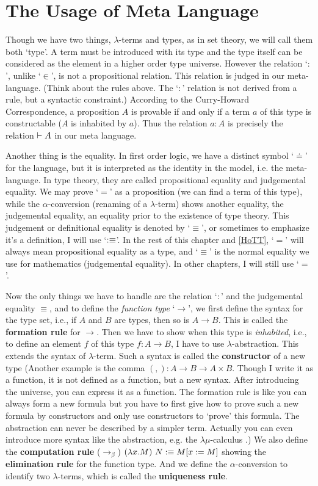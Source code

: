 \section{The Usage of Meta Language}
Though we have two things, $\lambda$-terms and types, as in set theory,
we will call them both `type'. A term must be introduced with its type 
and the type itself can be considered as the element in a higher order 
type universe. However the relation `$:$', unlike `$\in$', is not a 
propositional relation. This relation is judged in our meta-language. 
(Think about the rules above. The `$:$' relation is not derived from a 
rule, but a syntactic constraint.) According to the Curry-Howard 
Correspondence, a proposition $A$ is provable if and only if a term 
$a$ of this type is constructable ($A$ is inhabited by $a$). Thus the 
relation $a:A$ is precisely the relation $\vdash A$ in our meta language. 

Another thing is the equality. In first order logic, we have a distinct
symbol `$\doteq$' for the language, but it is interpreted as the identity
in the model, i.e. the meta-language. In type theory, they are called
propositional equality and judgemental equality. We may prove `$=$' as
a proposition (we can find a term of this type), while the 
$\alpha$-conversion (renaming of a $\lambda$-term) shows another equality,
the judgemental equality, an equality prior to the existence of type
theory. This judgement or definitional equality is denoted by `$\equiv$',
or sometimes to emphasize it's a definition, I will use `$:\equiv$'. In 
the rest of this chapter and \autoref{HoTT}, `$=$' will always mean
propositional equality as a type, and `$\equiv$' is the normal equality
we use for mathematics (judgemental equality). In other chapters, I will 
still use `$=$'. 

Now the only things we have to handle are the relation `$:$' and the 
judgemental equality $\equiv$, and to define the {\it function type} 
`$\to$', we first define the syntax for the type set, i.e., if $A$ and 
$B$ are types, then so is $A\to B$. This is called the {\bf formation 
rule} for $\to$. Then we have to show when this type is {\it inhabited}, 
i.e., to define an element $f$ of this type $f:A\to B$, I have to use 
$\lambda$-abstraction. This extends the syntax of $\lambda$-term. 
Such a syntax is called the {\bf constructor} of a new type 
(Another example is the comma $(,): A\to B\to A\times B$. Though I write 
it as a function, it is not defined as a function, but a new syntax. 
After introducing the universe, you can express it as a function. 
The formation rule is like you can always form a new formula but you
have to first give how to prove such a new formula by constructors and
only use constructors to `prove' this formula. The abstraction can never 
be described by a simpler term. Actually you can even introduce more 
syntax like the abstraction, e.g. the $\lambda\mu$-calculus 
\cite{lambda-mu-calculus}.) We also define the {\bf computation rule}
($\to_\beta$) $(\lambda x. M)\ N :\equiv M[x:=M]$ showing the 
{\bf elimination rule} for the function type. And we define the 
$\alpha$-conversion to identify two $\lambda$-terms, which is called 
the {\bf uniqueness rule}.

